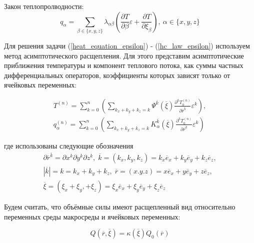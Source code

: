 Закон теплопролводности:
\begin{equation}
    \label{hc_law_epsilon}
    q_{\alpha}=\sum_{\beta \in \{x,y,z\}}\lambda_{\alpha \beta}\left(\frac{\partial T}{\partial \beta}\varepsilon+\frac{\partial T}{\partial \xi_{\beta}}\right), \:
    \alpha \in \{x,y,z\}
\end{equation}

Для решения задачи 
(\ref{heat_equation_epsilon})
-
(\ref{hc_law_epsilon})
используем метод асимптотического расщепления. Для этого представим асимптотические приближения температуры и компонент теплового потока,
как суммы частных дифференциальных операторов, коэффициенты которых зависят только от ячейковых переменных:

\begin{equation}
    \label{asimp_T_q}
    \begin{aligned}
        T^{(n)} = 
        \sum^n_{k=0} \left( \sum_{k_x+k_y+k_z=k} \Psi^{\overline{k}}(\overline{\xi})  
        \frac{\partial^kT^{(n)}_0}{\partial \overline{r}^{\overline{k}}}\varepsilon^k \right) ,
        \\
        q^{(n)}_{\alpha} = 
        \sum^n_{k=0} \left( \sum_{k_x+k_y+k_z=k} K^{\overline{k}}_{\alpha}(\overline{\xi})  
        \frac{\partial^kT^{(n)}_0}{\partial \overline{r}^{\overline{k}}}\varepsilon^k \right)
    \end{aligned}
\end{equation}

где использованы следующие обозначения
\begin{equation}
    \begin{gathered}
        \partial \overline{r}^{\overline{k}} = \partial x^k \partial y^k \partial z^k, \;
        \overline{k} = (k_x,k_y,k_z) = k_x \overline{e}_x+k_y \overline{e}_y+k_z \overline{e}_z,
        \\
        |\overline{k}| = k = k_x+k_y+k_z, \; \overline{r} = (x.y.z) = x \overline{e}_x + y \overline{e}_y + z \overline{e}_z,
        \\
        \overline{\xi} = \left( \xi_x + \xi_y, + \xi_z \right) = \xi_x \overline{e}_x + \xi_y \overline{e}_y + \xi_z \overline{e}_z
    \end{gathered}
\end{equation}


Будем считать, что объёмные силы имеют расщепленный вид относительно переменных среды макросреды и ячейковых переменных:

\begin{equation}
    \label{volum_force}
    Q \left( \overline{r}, \overline{\xi} \right) = \kappa \left( \overline{\xi} \right) Q_0 \left( \overline{r} \right)
\end{equation}

